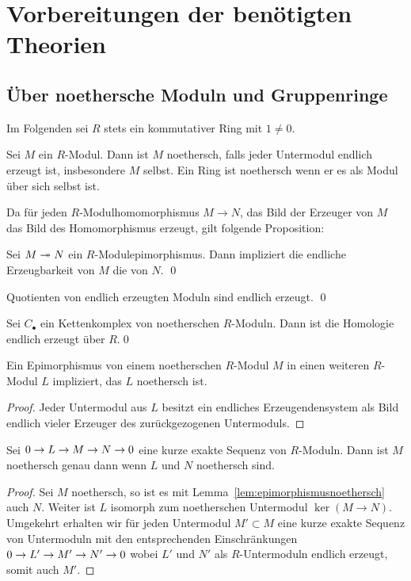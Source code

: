 

\section{Vorbereitungen der benötigten Theorien}
\label{sec:vorbereitungen}

\subsection{Über noethersche Moduln und Gruppenringe}
\label{sec:noetherianprinciples}
Im Folgenden sei $R$ stets ein kommutativer Ring mit $1\neq 0$.

Sei $M$ ein $R$-Modul. Dann ist $M$ noethersch, falls jeder Untermodul endlich erzeugt ist, insbesondere $M$ selbst. Ein Ring ist noethersch wenn er es als Modul über sich selbst ist. 

Da für jeden $R$-Modulhomomorphismus $M\to N$, das Bild der Erzeuger von $M$ das Bild des Homomorphismus erzeugt, gilt folgende Proposition:
\begin{prop}
	Sei $M \twoheadrightarrow N$ ein $R$-Modulepimorphismus. Dann impliziert die endliche Erzeugbarkeit von $M$ die von $N$. \qed
\end{prop}
\begin{cor}
	Quotienten von endlich erzeugten Moduln sind endlich erzeugt. \qed
\end{cor}
\begin{cor}
\label{cor:noethchaincomplex}
	Sei $C_\bullet$ ein Kettenkomplex von noetherschen $R$-Moduln. Dann ist die Homologie endlich erzeugt über $R$.\qed
\end{cor}

\begin{lem}
\label{lem:epimorphismusnoethersch}
	Ein Epimorphismus von einem noetherschen $R$-Modul $M$ in einen weiteren $R$-Modul $L$ impliziert, das $L$ noethersch ist.
\end{lem}
\begin{proof}
	Jeder Untermodul aus $L$ besitzt ein endliches Erzeugendensystem als Bild endlich vieler Erzeuger des zurückgezogenen Untermoduls.
\end{proof}
\begin{lem}
\label{lem:exaktnoethersch}
	Sei $0\to L\to M\to N\to0$ eine kurze exakte Sequenz von $R$-Moduln. Dann ist $M$ noethersch genau dann wenn $L$ und $N$ noethersch sind.
\end{lem}
\begin{proof}
	Sei $M$ noethersch, so ist es mit Lemma~\ref{lem:epimorphismusnoethersch} auch $N$. Weiter ist $L$ isomorph zum noetherschen Untermodul $\ker(M\to N)$. Umgekehrt erhalten wir für jeden Untermodul $M'\subset M$ eine kurze exakte Sequenz von Untermoduln mit den entsprechenden Einschränkungen $0\to L'\to M'\to N'\to0$ wobei $L'$ und $N'$ als $R$-Untermoduln endlich erzeugt, somit auch $M'$.
\end{proof}


